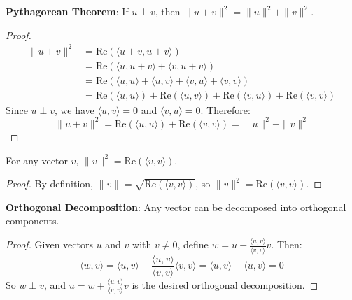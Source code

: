 \begin{theorem}
  \label{theorem : pythagorean}
  \leanok
  \textbf{Pythagorean Theorem}: If $u \perp v$, then $\|u + v\|^2 = \|u\|^2 + \|v\|^2$.
\end{theorem}
\begin{proof}
  \begin{align}
  \|u + v\|^2 &= \text{Re}(\langle u + v, u + v \rangle) \\
  &= \text{Re}(\langle u, u + v \rangle + \langle v, u + v \rangle) \\
  &= \text{Re}(\langle u, u \rangle + \langle u, v \rangle + \langle v, u \rangle + \langle v, v \rangle) \\
  &= \text{Re}(\langle u, u \rangle) + \text{Re}(\langle u, v \rangle) + \text{Re}(\langle v, u \rangle) + \text{Re}(\langle v, v \rangle)
  \end{align}
  Since $u \perp v$, we have $\langle u, v \rangle = 0$ and $\langle v, u \rangle = 0$. Therefore:
  $$\|u + v\|^2 = \text{Re}(\langle u, u \rangle) + \text{Re}(\langle v, v \rangle) = \|u\|^2 + \|v\|^2$$
\end{proof}

\begin{theorem}
  \label{theorem : norm_sq_eq}
  \leanok
  For any vector $v$, $\|v\|^2 = \text{Re}(\langle v, v \rangle)$.
\end{theorem}
\begin{proof}
  By definition, $\|v\| = \sqrt{\text{Re}(\langle v, v \rangle)}$, so $\|v\|^2 = \text{Re}(\langle v, v \rangle)$.
\end{proof}

\begin{theorem}
  \label{theorem : ortho_decom}
  \leanok
  \textbf{Orthogonal Decomposition}: Any vector can be decomposed into orthogonal components.
\end{theorem}
\begin{proof}
  Given vectors $u$ and $v$ with $v \neq 0$, define $w = u - \frac{\langle u, v \rangle}{\langle v, v \rangle} v$. Then:
  $$\langle w, v \rangle = \langle u, v \rangle - \frac{\langle u, v \rangle}{\langle v, v \rangle} \langle v, v \rangle = \langle u, v \rangle - \langle u, v \rangle = 0$$
  So $w \perp v$, and $u = w + \frac{\langle u, v \rangle}{\langle v, v \rangle} v$ is the desired orthogonal decomposition.
\end{proof}

